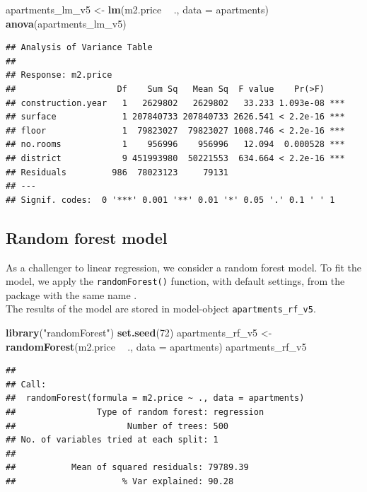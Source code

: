 \documentclass[]{krantz}
\newenvironment{Shaded}{\begin{snugshade}}{\end{snugshade}}
\newcommand{\DataTypeTok}[1]{\textcolor[rgb]{0.13,0.29,0.53}{#1}}
\newcommand{\DecValTok}[1]{\textcolor[rgb]{0.00,0.00,0.81}{#1}}
\newcommand{\KeywordTok}[1]{\textcolor[rgb]{0.13,0.29,0.53}{\textbf{#1}}}
\newcommand{\NormalTok}[1]{#1}
\newcommand{\OperatorTok}[1]{\textcolor[rgb]{0.81,0.36,0.00}{\textbf{#1}}}
\newcommand{\StringTok}[1]{\textcolor[rgb]{0.31,0.60,0.02}{#1}}
\begin{document}
\begin{Shaded}
\begin{Highlighting}[]
\NormalTok{apartments_lm_v5 <-}\StringTok{ }\KeywordTok{lm}\NormalTok{(m2.price }\OperatorTok{~}\StringTok{ }\NormalTok{., }\DataTypeTok{data =}\NormalTok{ apartments)}
\KeywordTok{anova}\NormalTok{(apartments_lm_v5)}
\end{Highlighting}
\end{Shaded}

\begin{verbatim}
## Analysis of Variance Table
## 
## Response: m2.price
##                    Df    Sum Sq   Mean Sq  F value    Pr(>F)    
## construction.year   1   2629802   2629802   33.233 1.093e-08 ***
## surface             1 207840733 207840733 2626.541 < 2.2e-16 ***
## floor               1  79823027  79823027 1008.746 < 2.2e-16 ***
## no.rooms            1    956996    956996   12.094  0.000528 ***
## district            9 451993980  50221553  634.664 < 2.2e-16 ***
## Residuals         986  78023123     79131                       
## ---
## Signif. codes:  0 '***' 0.001 '**' 0.01 '*' 0.05 '.' 0.1 ' ' 1
\end{verbatim}

\hypertarget{model-Apartments-rf}{%
\subsection{Random forest model}\label{model-Apartments-rf}}

As a challenger to linear regression, we consider a random forest model. To fit the model, we apply the \texttt{randomForest()} function, with default settings, from the package with the same name \citep{randomForest}.\\
The results of the model are stored in model-object \texttt{apartments\_rf\_v5}.

\begin{Shaded}
\begin{Highlighting}[]
\KeywordTok{library}\NormalTok{(}\StringTok{"randomForest"}\NormalTok{)}
\KeywordTok{set.seed}\NormalTok{(}\DecValTok{72}\NormalTok{)}
\NormalTok{apartments_rf_v5 <-}\StringTok{ }\KeywordTok{randomForest}\NormalTok{(m2.price }\OperatorTok{~}\StringTok{ }\NormalTok{., }\DataTypeTok{data =}\NormalTok{ apartments)}
\NormalTok{apartments_rf_v5}
\end{Highlighting}
\end{Shaded}

\begin{verbatim}
## 
## Call:
##  randomForest(formula = m2.price ~ ., data = apartments) 
##                Type of random forest: regression
##                      Number of trees: 500
## No. of variables tried at each split: 1
## 
##           Mean of squared residuals: 79789.39
##                     % Var explained: 90.28
\end{verbatim}
\end{document}
